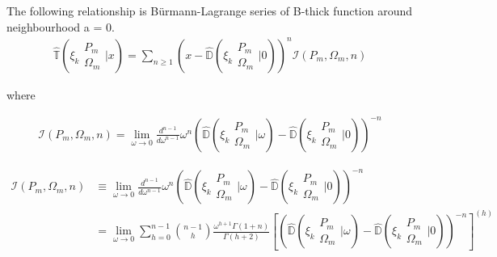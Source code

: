 \begin{conjecture}
        The following relationship is Bürmann-Lagrange series of 
        B-thick function around neighbourhood a = 0.
        \begin{align}
                \hat{\mathbb{T}}\left( \xi_k \begin{matrix} P_m 
                \\ \Omega_m \end{matrix} \bigg| x \right) 
                = \sum_{n \geq 1} \left( x - \hat{\mathbb{D}}
                \left( \xi_k \begin{matrix} P_m \\ \Omega_m 
                \end{matrix} \bigg| 0 \right)\right)^n 
                \mathcal{I}(P_m, \Omega_m, n)
        \end{align}
        
        where 
        
        \begin{align}
                \mathcal{I}(P_m, \Omega_m, n) = \lim_{\omega \to 0}
                \frac{d^{n-1}}{d\omega^{n-1}} \omega^n \left(\hat{
                \mathbb{D}}\left( \xi_k \begin{matrix} P_m \\ \Omega_m
                \end{matrix} \bigg| \omega \right) - \hat{\mathbb{D}}
                \left( \xi_k \begin{matrix} P_m \\ \Omega_m \end{matrix}
                \bigg| 0 \right)\right)^{-n}
        \end{align}
\end{conjecture}

\begin{align}
        \mathcal{I}(P_m, \Omega_m, n) &\equiv \lim_{\omega \to 0} 
        \frac{d^{n-1}}{d\omega^{n-1}} \omega^n \left(\hat{\mathbb{D}}
        \left( \xi_k \begin{matrix} P_m \\ \Omega_m \end{matrix} \bigg|
        \omega \right) - \hat{\mathbb{D}}\left( \xi_k \begin{matrix} P_m
        \\ \Omega_m \end{matrix} \bigg| 0 \right)\right)^{-n} \\
        & = \lim_{\omega \to 0} \sum^{n-1}_{h=0} \binom{n-1}{h} 
        \frac{\omega^{h+1}\Gamma(1+n)}{\Gamma(h+2)} \left[\left(\hat{
        \mathbb{D}}\left( \xi_k \begin{matrix} P_m \\ \Omega_m \end{matrix}
        \bigg| \omega \right) - \hat{\mathbb{D}}\left( \xi_k \begin{matrix} 
        P_m \\ \Omega_m \end{matrix} \bigg| 0 \right)\right)^{-n} \right]^{(h)}
\end{align}

